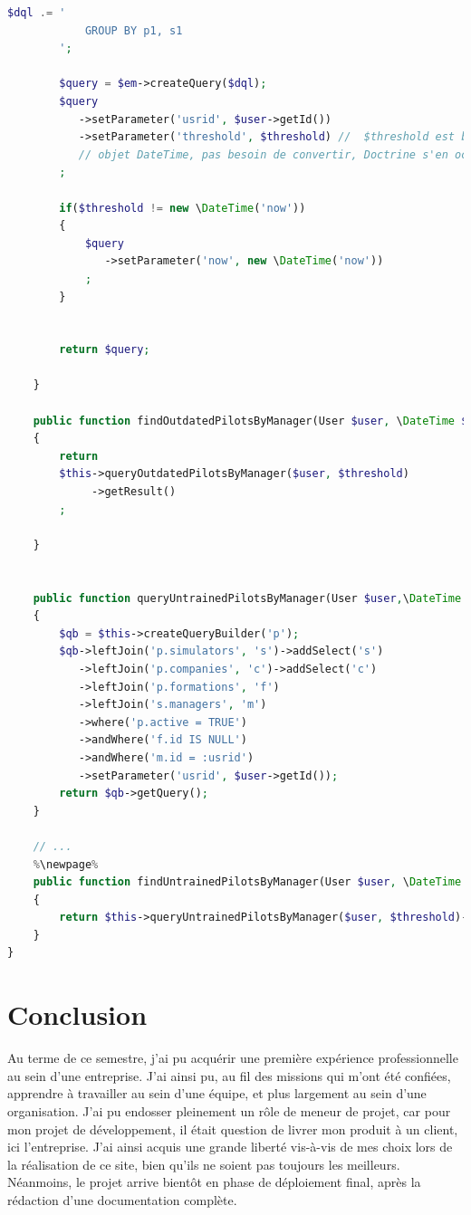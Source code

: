 \documentclass[a4paper,french,11pt,openany,oneside]{memoir}
\begin{document}
\begin{lstlisting}[language=php,escapechar=\%]
        $dql .= '  
            GROUP BY p1, s1
        ';
 
        $query = $em->createQuery($dql);
        $query
           ->setParameter('usrid', $user->getId())
           ->setParameter('threshold', $threshold) //  $threshold est bien un 
           // objet DateTime, pas besoin de convertir, Doctrine s'en occupera
        ;
 
        if($threshold != new \DateTime('now'))
        {
            $query
               ->setParameter('now', new \DateTime('now'))
            ;
        }

 
        return $query;

    }

    public function findOutdatedPilotsByManager(User $user, \DateTime $threshold = null)
    {
        return
        $this->queryOutdatedPilotsByManager($user, $threshold)
             ->getResult()
        ;

    }
 

    public function queryUntrainedPilotsByManager(User $user,\DateTime $threshold = null)
    {
        $qb = $this->createQueryBuilder('p');
        $qb->leftJoin('p.simulators', 's')->addSelect('s')
           ->leftJoin('p.companies', 'c')->addSelect('c')
           ->leftJoin('p.formations', 'f')
           ->leftJoin('s.managers', 'm')
           ->where('p.active = TRUE')
           ->andWhere('f.id IS NULL')
           ->andWhere('m.id = :usrid')
           ->setParameter('usrid', $user->getId());
        return $qb->getQuery();
    }
    
    // ...
    %\newpage%
    public function findUntrainedPilotsByManager(User $user, \DateTime $threshold = null)
    {
        return $this->queryUntrainedPilotsByManager($user, $threshold)->getResult();
    }
}
\end{lstlisting}

\backmatter

\chapter{Conclusion}

Au terme de ce semestre, j'ai pu acquérir une première expérience professionnelle au sein d'une entreprise. J'ai ainsi pu, au fil des missions qui m'ont été confiées, apprendre à travailler au sein d'une équipe, et plus largement au sein d'une organisation. J'ai pu endosser pleinement un rôle de meneur de projet, car pour mon projet de développement, il était question de livrer mon produit à un client, ici l'entreprise. J'ai ainsi acquis une grande liberté vis-à-vis de mes choix lors de la réalisation de ce site, bien qu'ils ne soient pas toujours les meilleurs. Néanmoins, le projet arrive bientôt en phase de déploiement final, après la rédaction d'une documentation complète. \\
\end{document}
